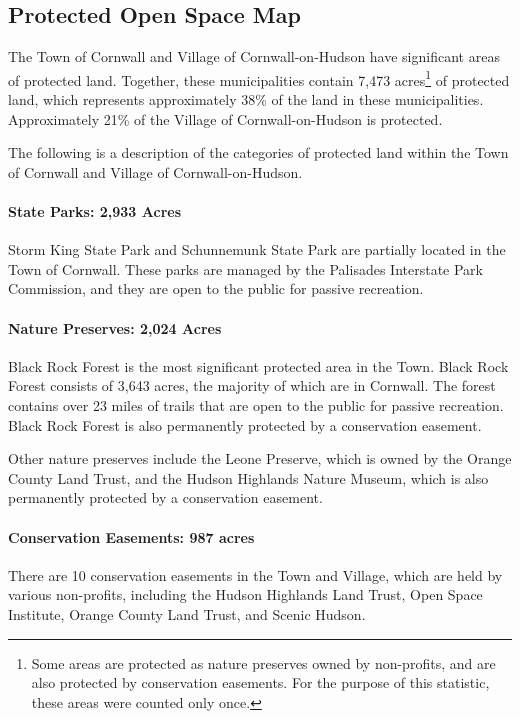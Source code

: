 \subsection*{Protected Open Space Map}\label{subsec:protectedopenspace}
The Town of Cornwall and Village of Cornwall-on-Hudson have significant areas
of protected land. Together, these municipalities contain 7,473
acres\footnote{Some areas are protected as nature preserves owned by
non-profits, and are also protected by conservation easements.  For the
purpose of this statistic, these areas were counted only once.} of protected
land, which represents approximately 38\% of the land in these municipalities.
Approximately 21\% of the Village of Cornwall-on-Hudson is protected. 

The following is a description of the categories of protected land within the 
Town of Cornwall and Village of Cornwall-on-Hudson.

\paragraph{State Parks: 2,933 Acres}Storm King State Park and Schunnemunk State Park are partially located in the Town of Cornwall. These parks are managed by the Palisades Interstate Park Commission, and they are open to the public for passive recreation.

\paragraph{Nature Preserves: 2,024 Acres}
Black Rock Forest is the most significant protected area in the Town. Black 
Rock Forest consists of 3,643 acres, the majority of which are in Cornwall. The 
forest contains over 23 miles of trails that are open to the public for passive 
recreation. Black Rock Forest is also permanently protected by a conservation 
easement. 

Other nature preserves include the Leone Preserve, which is owned by the Orange 
County Land Trust, and the Hudson Highlands Nature Museum, which is also 
permanently protected by a conservation easement.

\paragraph{Conservation Easements: 987 acres}
There are 10 conservation easements in the Town and Village, which are held by 
various non-profits, including the Hudson Highlands Land Trust, Open Space 
Institute, Orange County Land Trust, and Scenic Hudson. 

